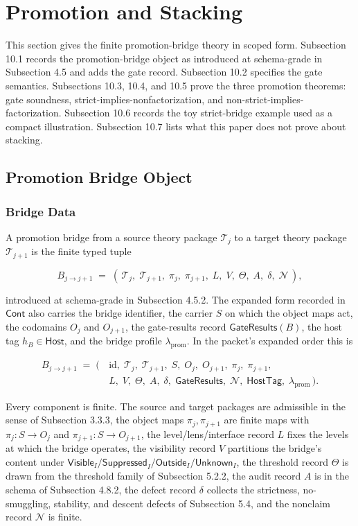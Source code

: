 \documentclass[11pt]{article}
\theoremstyle{definition}
\begin{document}
 \section{Promotion and Stacking}

This section gives the finite promotion-bridge theory in scoped form. Subsection 10.1 records the promotion-bridge object as introduced at schema-grade in Subsection 4.5 and adds the gate record. Subsection 10.2 specifies the gate semantics. Subsections 10.3, 10.4, and 10.5 prove the three promotion theorems: gate soundness, strict-implies-nonfactorization, and non-strict-implies-factorization. Subsection 10.6 records the toy strict-bridge example used as a compact illustration. Subsection 10.7 lists what this paper does not prove about stacking.

\subsection{Promotion Bridge Object}

\subsubsection{Bridge Data}

A promotion bridge from a source theory package \(\mathcal T_j\) to a target theory package \(\mathcal T_{j+1}\) is the finite typed tuple

\[
B_{j\to j+1}\;=\;(\,\mathcal T_j,\;\mathcal T_{j+1},\;\pi_j,\;\pi_{j+1},\;L,\;V,\;\Theta,\;A,\;\delta,\;\mathcal N\,),
\]

introduced at schema-grade in Subsection 4.5.2. The expanded form recorded in \(\mathsf{Cont}\) also carries the bridge identifier, the carrier \(S\) on which the object maps act, the codomains \(O_j\) and \(O_{j+1}\), the gate-results record \(\mathsf{GateResults}(B)\), the host tag \(h_B\in\mathsf{Host}\), and the bridge profile \(\lambda_{\mathrm{prom}}\). In the packet's expanded order this is

\[
\begin{aligned}
B_{j\to j+1}\;=\;(\,&\mathrm{id},\;\mathcal T_j,\;\mathcal T_{j+1},\;S,\;O_j,\;O_{j+1},\;\pi_j,\;\pi_{j+1},\\[2pt]
&L,\;V,\;\Theta,\;A,\;\delta,\;\mathsf{GateResults},\;\mathcal N,\;\mathsf{HostTag},\;\lambda_{\mathrm{prom}}\,).
\end{aligned}
\]

Every component is finite. The source and target packages are admissible in the sense of Subsection 3.3.3, the object maps \(\pi_j,\pi_{j+1}\) are finite maps with \(\pi_j:S\to O_j\) and \(\pi_{j+1}:S\to O_{j+1}\), the level/lens/interface record \(L\) fixes the levels at which the bridge operates, the visibility record \(V\) partitions the bridge's content under \(\mathsf{Visible}_I/\mathsf{Suppressed}_I/\mathsf{Outside}_I/\mathsf{Unknown}_I\), the threshold record \(\Theta\) is drawn from the threshold family of Subsection 5.2.2, the audit record \(A\) is in the schema of Subsection 4.8.2, the defect record \(\delta\) collects the strictness, no-smuggling, stability, and descent defects of Subsection 5.4, and the nonclaim record \(\mathcal N\) is finite.
\end{document}
